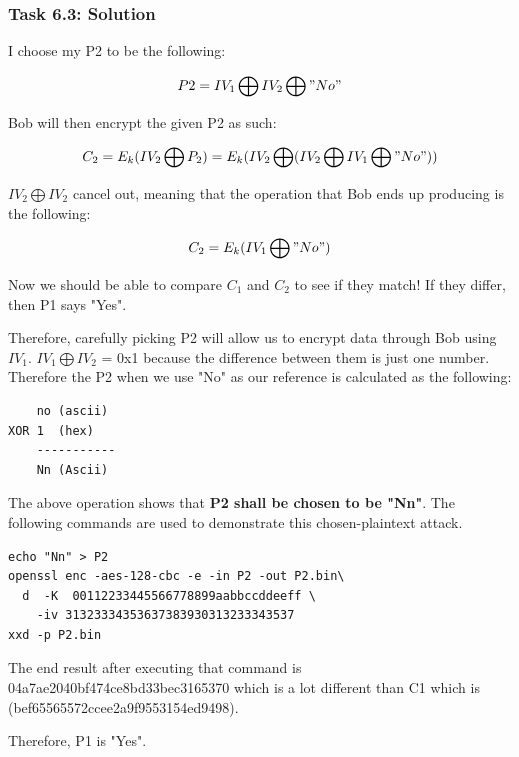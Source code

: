 \documentclass[12pt]{article}
\begin{document}
\clearpage
\subsubsection{Task 6.3: Solution}

I choose my P2 to be the following:

\[ P2 = IV_1 \bigoplus IV_2 \bigoplus "No" \]

Bob will then encrypt the given P2 as such:

\[ C_2 = E_{k} (IV_2 \bigoplus P_2 ) = E_{k} (IV_2\bigoplus (IV_2\bigoplus IV_1 \bigoplus "No")) \]

$IV_2 \bigoplus IV_2$ cancel out, meaning that the operation that Bob ends up producing is the following:

\[ C_2 = E_k (IV_1 \bigoplus "No") \]

Now we should be able to compare $C_1$ and $C_2$ to see if they match! If they differ, then P1 says "Yes".

Therefore, carefully picking P2 will allow us to encrypt data through Bob using $IV_1$. $IV_1 \bigoplus IV_2$ = 0x1 because the difference between them is just one number. Therefore the P2 when we use "No" as our reference is calculated as the following:

\begin{verbatim}
    no (ascii)
XOR 1  (hex)
    -----------
    Nn (Ascii)
\end{verbatim}

The above operation shows that \textbf{P2 shall be chosen to be "Nn"}. The following commands are used to demonstrate this chosen-plaintext attack.

\begin{verbatim}
echo "Nn" > P2
openssl enc -aes-128-cbc -e -in P2 -out P2.bin\
  d  -K  00112233445566778899aabbccddeeff \
    -iv 31323334353637383930313233343537
xxd -p P2.bin

\end{verbatim}

The end result after executing that command is 04a7ae2040bf474ce8bd33bec3165370 which is a lot different than C1 which is (bef65565572ccee2a9f9553154ed9498).

Therefore, P1 is "Yes".
\end{document}
